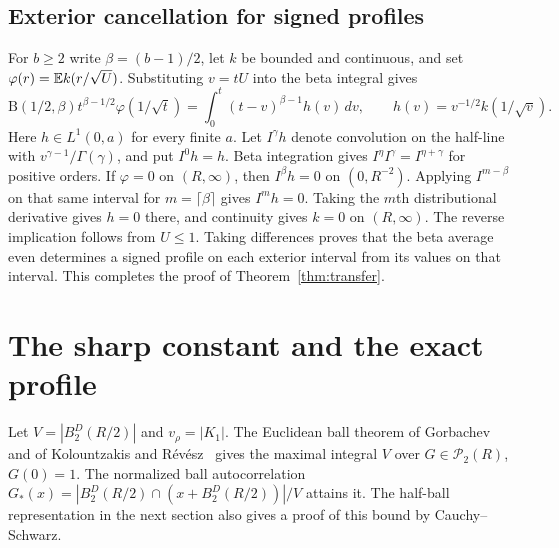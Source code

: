 \documentclass[11pt,a4paper]{article}
\numberwithin{equation}{section}
\newcommand{\B}{\mathrm B}\newcommand{\supp}{\operatorname{supp}}\newcommand{\vol}{\operatorname{vol}}
\begin{document}
\subsection{Exterior cancellation for signed profiles}
For $b\ge2$ write $\beta=(b-1)/2$, let $k$ be bounded and continuous, and set $\varphi(r)=\mathbb E k(r/\sqrt U)$. Substituting $v=tU$ into the beta integral gives
\begin{equation}
 \B(1/2,\beta)t^{\beta-1/2}\varphi(1/\sqrt t)
   =\int_0^t(t-v)^{\beta-1}h(v)\,dv,\qquad h(v)=v^{-1/2}k(1/\sqrt v).
\end{equation}
Here $h\in L^1(0,a)$ for every finite $a$. Let $I^\gamma h$ denote convolution on the half-line with $v^{\gamma-1}/\Gamma(\gamma)$, and put $I^0h=h$. Beta integration gives $I^\eta I^\gamma=I^{\eta+\gamma}$ for positive orders. If $\varphi=0$ on $(R,\infty)$, then $I^\beta h=0$ on $(0,R^{-2})$. Applying $I^{m-\beta}$ on that same interval for $m=\lceil\beta\rceil$ gives $I^m h=0$. Taking the $m$th distributional derivative gives $h=0$ there, and continuity gives $k=0$ on $(R,\infty)$. The reverse implication follows from $U\le1$. Taking differences proves that the beta average even determines a signed profile on each exterior interval from its values on that interval. This completes the proof of Theorem~\ref{thm:transfer}.


\section{The sharp constant and the exact profile}
Let $V=|B_2^D(R/2)|$ and $v_\rho=|K_1|$. The Euclidean ball theorem of Gorbachev and of Kolountzakis and R\'ev\'esz~\cite{KR} gives the maximal integral $V$ over $G\in\mathcal P_2(R)$, $G(0)=1$. The normalized ball autocorrelation $G_*(x)=|B_2^D(R/2)\cap(x+B_2^D(R/2))|/V$ attains it. The half-ball representation in the next section also gives a proof of this bound by Cauchy--Schwarz.
\end{document}
